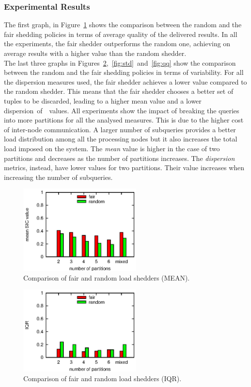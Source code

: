 \subsubsection*{Experimental Results} 
\vspace{-10pt}
The first graph, in Figure~\ref{fig:mean} shows the comparison
between the random and the fair shedding policies in terms of average quality of the delivered results.
In all the experiments, the fair shedder outperforms the random one, achieving on average results
with a higher \sic value than the random shedder. \\
The last three graphs in Figures~\ref{fig:iqr},~\ref{fig:std}~and~\ref{fig:qq} show the comparison
between the random and the fair shedding policies in terms of variability. For all the dispersion
measures used, the fair shedder achieves a lower value compared to the random shedder. This means that
the fair shedder chooses a better set of tuples to be discarded, leading to a higher mean \sic value
and a lower dispersion~of~\sic~values. 
All experiments show the impact of breaking the queries into more partitions for all the analysed
measures. This is due to the higher cost of inter-node communication. A larger number of subqueries
provides a better load distribution among all the processing nodes but it also increases the total load
imposed on the system. The \emph{mean} \sic value is higher in the case of two partitions and decreases
as the number of partitions increases. The \emph{dispersion} metrics, instead, have lower values for two
partitions. Their value increases when increasing the number of subqueries.
\begin{figure}[h!]
\centering
\includegraphics[width=0.55\textwidth]{img/tesi/mean}
\caption{Comparison of fair and random load shedders (MEAN).}
\label{fig:mean}
\end{figure}
\clearpage
\begin{figure}[h!]
\centering
\includegraphics[width=0.55\textwidth]{img/tesi/iqr}
\caption{Comparison of fair and random load shedders (IQR).}
\label{fig:iqr}
\end{figure}

